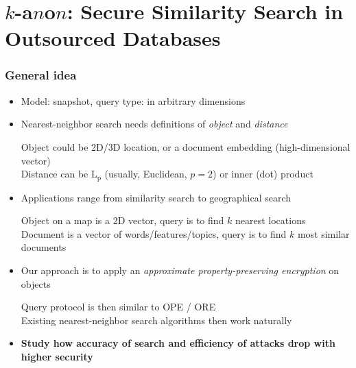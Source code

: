 \section{$k$-a$n$o$n$: Secure Similarity Search in Outsourced Databases \cite{k-anon}}

	\begin{frame}[label={frame:knn}]

		\frametitle{General idea}

		\begin{itemize}
			\item<1->
				Model: \alert{snapshot}, query type: \alert{\knn{}} in arbitrary dimensions

			\item<2->
				Nearest-neighbor search needs definitions of \emph{object} and \emph{distance} \\
				\begin{small}
					\indent{} Object could be 2D/3D location, or a document embedding (high-dimensional vector) \\
					\indent{} Distance can be $\text{L}_\text{p}$ (usually, Euclidean, $p = 2$) or inner (dot) product
				\end{small}

			\item<3->
				Applications range from similarity search to geographical search \\
				\begin{small}
					\indent{} Object on a map is a 2D vector, query is to find $k$ nearest locations \\
					\indent{} Document is a vector of words/features/topics, query is to find $k$ most similar documents
				\end{small}

			\item<4->
				Our approach is to apply an \emph{approximate property-preserving encryption} on objects \\
				\begin{small}
					\indent{} Query protocol is then similar to OPE / ORE \\
					\indent{} Existing nearest-neighbor search algorithms then work naturally
				\end{small}

			\item<5->
				\textbf{Study how accuracy of search and efficiency of attacks drop with higher security}

		\end{itemize}

	\end{frame}


